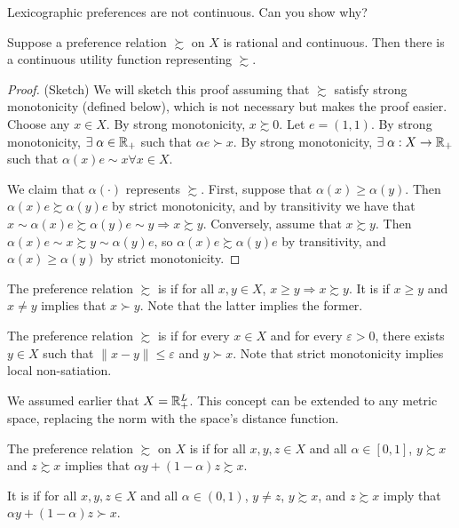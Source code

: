 \documentclass[12pt]{article}
\begin{document}
\begin{remark}
	Lexicographic preferences are not continuous. Can you show why?
\end{remark}
\begin{proposition}\label{prop:debreu}
	 Suppose a preference relation $\succsim$ on $X$ is rational and continuous. Then there is a continuous utility function representing $\succsim$.
\end{proposition}
\begin{proof}
	(Sketch) We will sketch this proof assuming that $\succsim$ satisfy strong monotonicity (defined below), which is not necessary but makes the proof easier. Choose any $x \in X$. By strong monotonicity, $x \succsim 0$. Let $e = (1,1)$. By strong monotonicity, $\exists \alpha \in \reals_+$ such that $\alpha e \succ x$. By strong monotonicity, $\exists \alpha : X \to \reals_+$ such that $\alpha(x)e\sim x \forall x \in X$. 
	
	We claim that $\alpha(\cdot)$ represents $\succsim$. First, suppose that $\alpha(x) \ge \alpha(y)$. Then $\alpha(x)e \succsim \alpha(y)e$ by strict monotonicity, and by transitivity we have that $x \sim \alpha(x)e \succsim \alpha(y)e \sim y \Longrightarrow x \succsim y$. Conversely, assume that $x\succsim y$. Then $\alpha(x)e \sim x \succsim y \sim \alpha(y)e$, so $\alpha(x)e\succsim \alpha(y)e$ by transitivity, and $\alpha(x) \ge \alpha(y)$ by strict monotonicity.
\end{proof}

\begin{definition}
	The preference relation $\succsim$ is  if for all $x,y \in X$, $x \ge y \Longrightarrow x\succsim y$. It is  if $x \ge y$ and $x \ne y$ implies that $x \succ y$. Note that the latter implies the former.
\end{definition}

\begin{definition}
	The preference relation $\succsim$ is  if for every $x \in X$ and for every $\varepsilon > 0$, there exists $y \in X$ such that $\|x - y\| \le \varepsilon$ and $y \succ x$. Note that strict monotonicity implies local non-satiation.
\end{definition}
\begin{remark}
	We assumed earlier that $X = \mathbb{R}^L_+$. This concept can be extended to any metric space, replacing the norm with the space's distance function.  
\end{remark}
\begin{definition}
	The preference relation $\succsim$ on $X$ is  if for all $x,y,z\in X$ and all $\alpha \in [0,1]$, $y \succsim x$ and $z \succsim x$ implies that $\alpha y + (1-\alpha)z \succsim x$.
	
	It is  if for all $x,y,z \in X$ and all $\alpha \in (0,1)$, $y \ne z$, $y \succsim x$, and $z \succsim x$ imply that $\alpha y + (1-\alpha)z \succ x$.
\end{definition}
\end{document}
